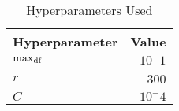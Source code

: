 \begin{table}[!ht]
    \begin{center}
        \begin{tabular}{| l | r |}
        \hline
        Hyperparameter & Value \\
        \hline
        $\max_{\text{df}}$ & $10^-1$ \\
        \hline
        $r$ & 300 \\
        \hline
        $C$ & $10^-4$ \\
        \hline
        \end{tabular}
    \end{center}
    \caption{Hyperparameters Used}
\end{table}
